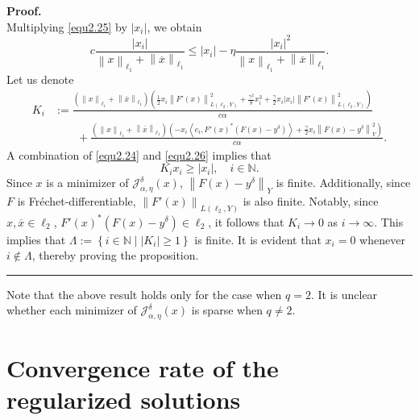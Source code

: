 \documentclass[a4paper,12pt]{article}
\numberwithin{equation}{section}
\newenvironment{proof}[1][Proof]{\textbf{#1.} }
{\ \rule{0.75em}{0.75em}\smallskip}
\begin{document}
\begin{proof}
\begin{equation}
    \end{equation}
    Multiplying \eqref{equ2.25} by $\left|x_{i}\right|$, we obtain
    \begin{equation}\label{equ2.26}
        c\frac{\left|x_{i}\right|}{\left\|x\right\|_{\ell_{1}}+ \left\|\overline{x}\right\|_{\ell_{1}}} \leq \left|x_{i}\right|-\eta\frac{\left|x_{i}\right|^{2}}{\left\|x\right\|_{\ell_{1}}+ \left\|\overline{x}\right\|_{\ell_{1}}}.
    \end{equation}
    Let us denote
    \begin{align*}
        K_{i}
        & := \frac{\left(\left\|x\right\|_{\ell_{1}}+ \left\|\overline{x}\right\|_{\ell_{1}}\right)\left(\frac{1}{2}x_{i} \left\|F'\left(x\right)\right\|_{L\left(\ell_{2},Y\right)}^{2}+\frac{\gamma^{2}}{8} x_{i}^{3}+\frac{\gamma}{2}x_{i}\left|x_{i}\right| \left\|F'\left(x\right)\right\|_{L\left(\ell_{2},Y\right)}^{2}\right)}{c\alpha} \\
        & \qquad + \frac{\left(\left\|x\right\|_{\ell_{1}}+ \left\|\overline{x}\right\|_{\ell_{1}}\right)\left(-x_{i}\left<e_{i}, F'\left(x\right)^{*} \left(F\left(x\right)-y^{\delta}\right)\right>+ \frac{\gamma}{2}x_{i}\left\|F\left(x\right)- y^{\delta}\right\|_{Y}^{2}\right)}{c\alpha}.
    \end{align*}
    A combination of \eqref{equ2.24} and \eqref{equ2.26} implies that
    \begin{equation*}
        K_{i}x_{i}\geq\left|x_{i}\right|, \quad i\in\mathbb{N}.
    \end{equation*}
    Since $x$ is a minimizer of $\mathcal{J}_{\alpha,\eta}^{\delta}\left(x\right)$, $\left\|F\left(x\right)-y^{\delta}\right\|_{Y}$ is finite. Additionally, since $F$ is Fr\'{e}chet-differentiable, $\left\|F'\left(x\right)\right\|_{L\left(\ell_{2}, Y\right)}$ is also finite. Notably, since $x,\overline{x}\in\ell_{2}$, $F'\left(x\right)^{*} \left(F\left(x\right)-y^{\delta}\right)\in\ell_{2}$, it follows that $K_{i}\rightarrow 0$ as $i\rightarrow\infty$. This implies that $\Lambda:=\left\{i\in\mathbb{N}\mid\left| K_{i}\right|\geq 1\right\}$ is finite. It is evident that $x_{i}=0$ whenever $i\notin\Lambda$, thereby proving the proposition.
\end{proof}

\par Note that the above result holds only for the case when $q=2$. It is unclear whether each minimizer of $\mathcal{J}_{\alpha,\eta}^{\delta}\left(x\right)$ is sparse when $q\neq 2$.

\section{Convergence rate of the regularized solutions}\label{sec3}
\end{document}
